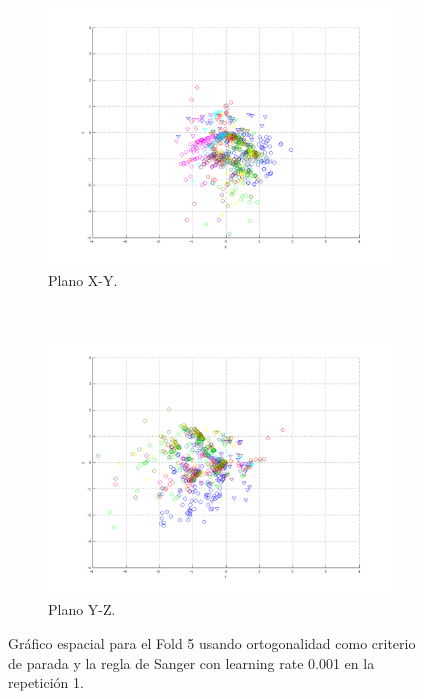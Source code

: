 \documentclass[informe.tex]{subfiles}
\begin{document}
\begin{figure}[H]
        \hspace*{-6.5cm}
        \begin{subfigure}[b]{0.49\textwidth}
                \includegraphics[width=\textwidth]{graficos/fold5_criterioParadao_reglas_alpha0_rep1_2XY.png}
                \caption{Plano X-Y.}
        \end{subfigure}
        ~
        \begin{subfigure}[b]{0.49\textwidth}
                \includegraphics[width=\textwidth]{graficos/fold5_criterioParadao_reglas_alpha0_rep1_3YZ.png}
                \caption{Plano Y-Z.}
        \end{subfigure}
	\restoregeometry
        \caption{Gráfico espacial para el Fold 5 usando ortogonalidad como criterio de parada y la regla de Sanger con learning rate 0.001 en la repetición 1.}
        \label{fig:fold5_criterioParadao_reglas_alpha0_rep1}
	\end{figure}
      
\end{document}
